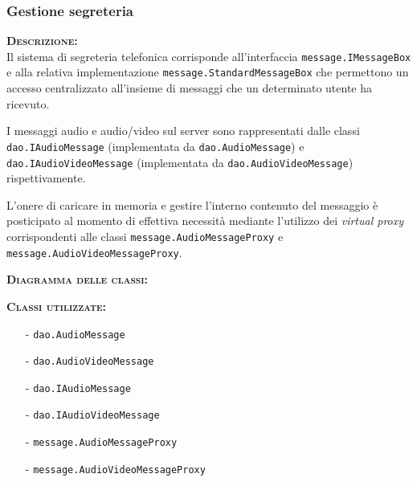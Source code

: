 \subsubsection{Gestione segreteria}
\begin{description}
	\item{\scshape\bfseries Descrizione:}\\
Il sistema di segreteria telefonica corrisponde all'interfaccia \texttt{message.IMessageBox} e alla relativa implementazione \texttt{message.StandardMessageBox} che permettono un accesso centralizzato all'insieme di messaggi che un determinato utente ha ricevuto.

I messaggi audio e audio/video sul server sono rappresentati dalle classi \texttt{dao.IAudioMessage} (implementata da \texttt{dao.AudioMessage}) e \texttt{dao.IAudioVideoMessage} (implementata da \texttt{dao.AudioVideoMessage}) rispettivamente.

L'onere di caricare in memoria e gestire l'interno contenuto del messaggio è posticipato al momento di effettiva necessità mediante l'utilizzo dei \textit{virtual proxy} corrispondenti alle classi \texttt{message.AudioMessageProxy} e \texttt{message.AudioVideoMessageProxy}.
	\item{\scshape\bfseries Diagramma delle classi:}
	\item{\scshape\bfseries Classi utilizzate:}
	\begin{itemize}[noitemsep,nolistsep]
	  \item[-] \texttt{dao.AudioMessage}
	  \item[-] \texttt{dao.AudioVideoMessage}
	  \item[-] \texttt{dao.IAudioMessage}
	  \item[-] \texttt{dao.IAudioVideoMessage}
	  \item[-] \texttt{message.AudioMessageProxy}
	  \item[-] \texttt{message.AudioVideoMessageProxy}
	\end{itemize}
\end{description}


